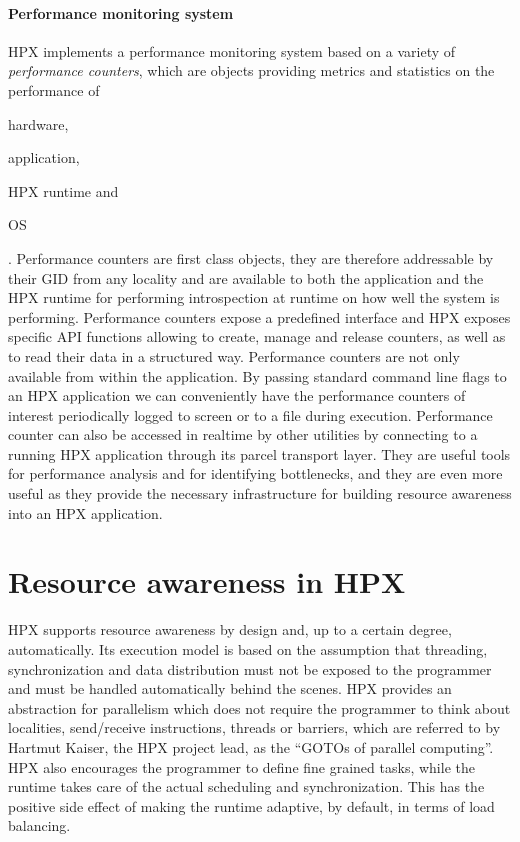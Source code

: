 \paragraph{Performance monitoring system}
HPX implements a performance monitoring system based on a variety of \emph{performance counters}, which are objects providing metrics and statistics on the performance of
\begin{enumerate*}[label={(\roman*)}]
	\item hardware,
	\item application,
	\item HPX runtime and
	\item OS
\end{enumerate*}.
Performance counters are first class objects, they are therefore addressable by their GID from any locality and are available to both the application and the HPX runtime for performing introspection at runtime on how well the system is performing.\cite{kaiser2014hpx}
Performance counters expose a predefined interface and HPX exposes specific API functions allowing to create, manage and release counters, as well as to read their data in a structured way.
Performance counters are not only available from within the application. By passing standard command line flags to an HPX application we can conveniently have the performance counters of interest periodically logged to screen or to a file during execution. Performance counter can also be accessed in realtime by other utilities by connecting to a running HPX application through its parcel transport layer\cite{kaiser2014hpx}.
They are useful tools for performance analysis and for identifying bottlenecks, and they are even more useful as they provide the necessary infrastructure for building resource awareness into an HPX application\cite{grubel2016using}.


\section{Resource awareness in HPX} \label{sec:hpxRAC}
HPX supports resource awareness by design and, up to a certain degree, automatically.
Its execution model is based on the assumption that threading, synchronization and data distribution must not be exposed to the programmer and must be handled automatically behind the scenes. HPX provides an abstraction for parallelism which does not require the programmer to think about localities, send/receive instructions, threads or barriers, which are referred to by Hartmut Kaiser, the HPX project lead, as the ``GOTOs of parallel computing''\cite{kaiser2014goto}. HPX also encourages the programmer to define fine grained tasks, while the runtime takes care of the actual scheduling and synchronization. This has the positive side effect of making the runtime adaptive, by default, in terms of load balancing.

